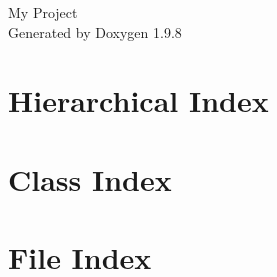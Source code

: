 \documentclass[twoside]{book}
\newcommand{\+}{\discretionary{\mbox{\scriptsize$\hookleftarrow$}}{}{}}
\newcommand{\clearemptydoublepage}{%
    \newpage{\pagestyle{empty}\cleardoublepage}%
  }
\begin{document}
  \raggedbottom
    \hypersetup{pageanchor=false,
                bookmarksnumbered=true,
                pdfencoding=unicode
               }
  \begin{titlepage}
  \vspace*{7cm}
  \begin{center}%
  {\Large My Project}\\
  \vspace*{1cm}
  {\large Generated by Doxygen 1.9.8}\\
  \end{center}
  \end{titlepage}
  \clearemptydoublepage
  \tableofcontents
  \clearemptydoublepage
  \hypersetup{pageanchor=true}
\chapter{Hierarchical Index}

\chapter{Class Index}

\chapter{File Index}

\end{document}
